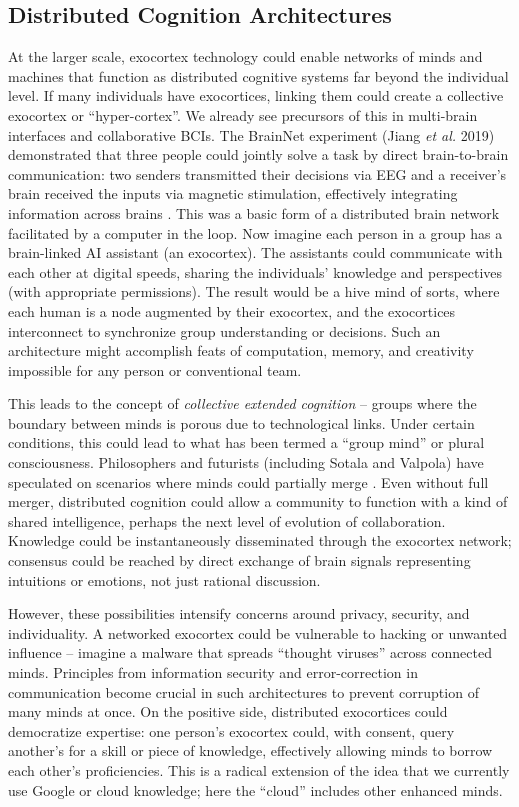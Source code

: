 \documentclass[11pt]{article}
\newcommand{\quotes}[1]{``#1''}
\begin{document}
\subsection{Distributed Cognition Architectures}
At the larger scale, exocortex technology could enable networks of minds and machines that function as distributed cognitive systems far beyond the individual level. If many individuals have exocortices, linking them could create a collective exocortex or \quotes{hyper-cortex}. We already see precursors of this in multi-brain interfaces and collaborative BCIs. The BrainNet experiment (Jiang \textit{et al.} 2019) demonstrated that three people could jointly solve a task by direct brain-to-brain communication: two senders transmitted their decisions via EEG and a receiver's brain received the inputs via magnetic stimulation, effectively integrating information across brains \cite{Jiang2019}. This was a basic form of a distributed brain network facilitated by a computer in the loop. Now imagine each person in a group has a brain-linked AI assistant (an exocortex). The assistants could communicate with each other at digital speeds, sharing the individuals' knowledge and perspectives (with appropriate permissions). The result would be a hive mind of sorts, where each human is a node augmented by their exocortex, and the exocortices interconnect to synchronize group understanding or decisions. Such an architecture might accomplish feats of computation, memory, and creativity impossible for any person or conventional team.

This leads to the concept of \textit{collective extended cognition} -- groups where the boundary between minds is porous due to technological links. Under certain conditions, this could lead to what has been termed a \quotes{group mind} or plural consciousness. Philosophers and futurists (including Sotala and Valpola) have speculated on scenarios where minds could partially merge \cite{Sotala2012}. Even without full merger, distributed cognition could allow a community to function with a kind of shared intelligence, perhaps the next level of evolution of collaboration. Knowledge could be instantaneously disseminated through the exocortex network; consensus could be reached by direct exchange of brain signals representing intuitions or emotions, not just rational discussion. 

However, these possibilities intensify concerns around privacy, security, and individuality. A networked exocortex could be vulnerable to hacking or unwanted influence -- imagine a malware that spreads \quotes{thought viruses} across connected minds. Principles from information security and error-correction in communication become crucial in such architectures to prevent corruption of many minds at once. On the positive side, distributed exocortices could democratize expertise: one person's exocortex could, with consent, query another's for a skill or piece of knowledge, effectively allowing minds to borrow each other's proficiencies. This is a radical extension of the idea that we currently use Google or cloud knowledge; here the \quotes{cloud} includes other enhanced minds.
\end{document}
